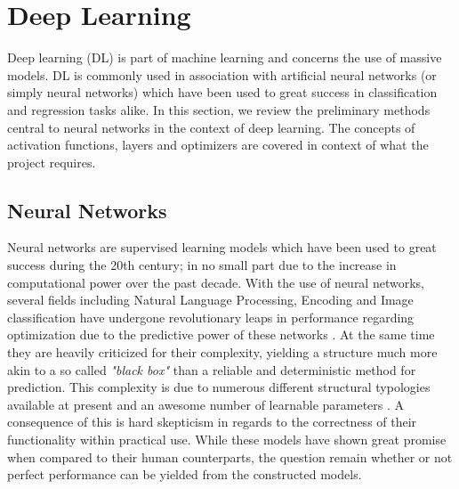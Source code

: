 \section{Deep Learning}

Deep learning (DL) is part of machine learning and concerns the use of massive models. DL is commonly used in association with artificial neural networks (or simply neural networks) which have been used to great success in classification and regression tasks alike. In this section, we review the preliminary methods central to neural networks in the context of deep learning. The concepts of activation functions, layers and optimizers are covered in context of what the project requires. 

\subsection{Neural Networks}
Neural networks are supervised learning models which have been used to great success during the 20th century; in no small part due to the increase in computational power over the past decade. With the use of neural networks, several fields including Natural Language Processing, Encoding and Image classification have undergone revolutionary leaps in performance regarding optimization due to the predictive power of these networks \cite{sharir2020cost, kukacka2012overview, zhang2015deep, lee2017deep}. At the same time they are heavily criticized for their complexity, yielding a structure much more akin to a so called \textit{"black box"} than a reliable and deterministic method for prediction. This complexity is due to numerous different structural typologies available at present and an awesome number of learnable parameters \cite{qiu2004opening}. A consequence of this is hard skepticism in regards to the correctness of their functionality within practical use. While these models have shown great promise when compared to their human counterparts, the question remain whether or not perfect performance can be yielded from the constructed models.

